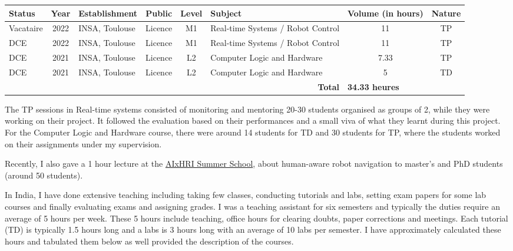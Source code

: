 \documentclass[11pt]{article}
\newcommand{\boldheading}[1]{\par\vspace{4pt}{\bfseries #1\par}\vspace{2pt}}
\begin{document}
\begin{table}[H]
\centering
\fontsize{10}{12}\selectfont
\setlength{\tabcolsep}{3pt} %
\begin{tabularx}{\linewidth}{|l|c|l|c|c|X|c|c|}
\hline
\textbf{Status} & \textbf{Year} & \textbf{Establishment} & \textbf{Public} & \textbf{Level} & \textbf{Subject} & \textbf{Volume (in hours)} & \textbf{Nature} \\ \hline
Vacataire & 2022 & INSA, Toulouse & Licence & M1 & Real-time Systems / Robot Control & 11 & TP \\ \hline
DCE & 2022 & INSA, Toulouse & Licence & M1 & Real-time Systems / Robot Control & 11 & TP \\ \hline
DCE & 2021 & INSA, Toulouse & Licence & L2 & Computer Logic and Hardware & 7.33 & TP \\ \hline
DCE & 2021 & INSA, Toulouse & Licence & L2 & Computer Logic and Hardware & 5 & TD \\ \hline
\multicolumn{6}{|r|}{\textbf{Total}} & \multicolumn{2}{l|}{\textbf{34.33 heures}} \\ \hline
\end{tabularx}
\end{table}


The TP sessions in Real-time systems consisted of monitoring and mentoring 20-30 students organised as groups of 2, while they were working on their project. It followed the evaluation based on their performances and a small viva of what they learnt during this project. For the Computer Logic and Hardware course, there were around 14 students for TD and 30 students for TP, where the students worked on their assignments under my supervision.

Recently, I also gave a 1 hour lecture at the \href{https://aihumanrobot.sciencesconf.org/resource/page/id/1}{AIxHRI Summer School}, about human-aware robot navigation to master’s and PhD students (around 50 students).\\


\boldheading{Activities in India}

In India, I have done extensive teaching including taking few classes, conducting tutorials and labs, setting exam papers for some lab courses and finally evaluating exams and assigning grades. I was a teaching assistant for six semesters and typically the duties require an average of 5 hours per week. These 5 hours include teaching, office hours for clearing doubts, paper corrections and meetings. Each tutorial (TD) is typically 1.5 hours long and a labs is 3 hours long with an average of 10 labs per semester. I have approximately calculated these hours and tabulated them below as well provided the description of the courses.
\end{document}
